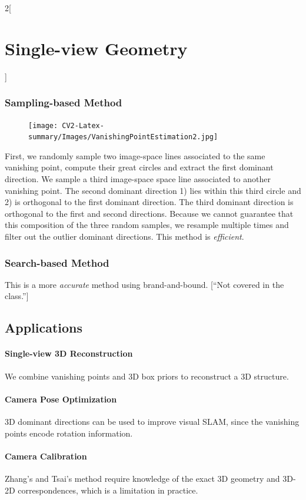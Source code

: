 \documentclass[oneside,fontsize=11pt,paper=a4]{scrartcl}
\begin{document}
\begin{multicols}{2}[\section{Single-view Geometry}]
\subsubsection{Sampling-based Method}
\begin{figure}
    \texttt{[image: CV2-Latex-summary/Images/VanishingPointEstimation2.jpg]}
\end{figure}
First, we randomly sample two image-space lines associated to the same vanishing point, compute their great circles and extract the {\color{red}first dominant direction}. We sample a third image-space space line associated to another vanishing point. The {\color{blue}second dominant direction} 1) lies within this third circle and 2) is orthogonal to the first dominant direction. The {\color{green}third dominant direction} is orthogonal to the first and second directions. Because we cannot guarantee that this composition of the three random samples, we resample multiple times and filter out the outlier dominant directions. This method is \textit{efficient}.


\subsubsection{Search-based Method}

This is a more \textit{accurate} method using brand-and-bound. [``Not covered in the class.'']

\subsection{Applications}

\paragraph{Single-view 3D Reconstruction} We combine vanishing points and 3D box priors to reconstruct a 3D structure.

\paragraph{Camera Pose Optimization} 3D dominant directions can be used to improve visual SLAM, since the vanishing points encode rotation information.

\paragraph{Camera Calibration} Zhang's and Tsai's method require knowledge of the exact 3D geometry and 3D-2D correspondences, which is a limitation in practice. 


\end{multicols}
\end{document}
